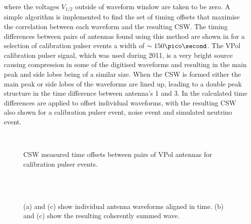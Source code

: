 \noindent where the voltages $V_{1/2}$ outside of waveform window are taken to be zero. A simple algorithm is implemented to find the set of timing offsets that maximise the correlation between each waveform and the resulting CSW. The timing differences between pairs of antennas found using this method are shown in  for a selection of calibration pulser events a width of $\sim 150 \pico \second$. The VPol calibration pulser signal, which was used during 2011, is a very bright source causing compression in some of the digitised waveforms and resulting in the main peak and side lobes being of a similar size. When the CSW is formed either the main peak or side lobes of the waveforms are lined up, leading to a double peak structure in the time difference between antenna's 1 and 3. In  the calculated time differences are applied to offset individual waveforms, with the resulting CSW also shown for a calibration pulser event, noise event and simulated neutrino event.


\begin{figure}[htpb]
  \hfill
  \\
  \caption{CSW measured time offsets between pairs of VPol antennas for calibration pulser events.}
  \label{fig:analysis:Reconstruction:CSW-DeltaT}
\end{figure}
%



\begin{figure}[htpb]
  \hfill
  \\
  \hfill
  \\
  \hfill
  \caption{(a) and (c) show individual antenna waveforms aligned in time. (b) and (c) show the resulting coherently summed wave.} 
  \label{fig:analysis:Reconstruction:CSW-Example}
\end{figure}


